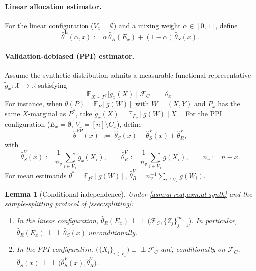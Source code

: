 \documentclass[11pt]{article}
\theoremstyle{plain}
\newtheorem{lemma}[theorem]{Lemma}
\theoremstyle{definition}
\theoremstyle{remark}
\newcommand{\R}{\mathbb{R}}
\newcommand{\E}{\mathbb{E}}
\newcommand{\indep}{\perp\!\!\!\perp}
\begin{document}
\paragraph{Linear allocation estimator.}
For the linear configuration ($V_x=\emptyset$) and a mixing weight $\alpha\in[0,1]$, define
\begin{equation}\label{eq:linest}
\hat\theta^{\mathrm{L}}(\alpha,x):=\alpha\,\hat\theta_R(E_x)+(1-\alpha)\,\hat\theta_S(x).
\end{equation}

\paragraph{Validation-debiased (PPI) estimator.}
Assume the synthetic distribution admits a measurable functional representative $\tilde g_x:\mathcal{X}\to\R$ satisfying
\begin{equation}\label{eq:tildeg}
\E_{X\sim P^*}\bigl[\tilde g_x(X)\mid\mathcal{F}_C\bigr]\;=\;\theta_x.
\end{equation}
For instance, when $\theta(P)=\E_P[g(W)]$ with $W=(X,Y)$ and $P_x$ has the same $X$-marginal as $P^*$, take $\tilde g_x(X)=\E_{P_x}[g(W)\mid X]$. For the PPI configuration ($E_x=\emptyset$, $V_x=[n]\setminus C_x$), define
\begin{equation}\label{eq:ppi}
\hat\theta^{\mathrm{PP}}(x)\;:=\;\hat\theta_S(x)-\hat\theta_S^V(x)+\hat\theta_R^V,
\end{equation}
with
\begin{equation*}
\hat\theta_S^V(x):=\frac{1}{n_v}\sum_{i\in V_x}\tilde g_x(X_i),\qquad
\hat\theta_R^V:=\frac{1}{n_v}\sum_{i\in V_x}g(X_i),\qquad n_v:=n-x.
\end{equation*}
For mean estimands $\theta^*=\E_{P^*}[g(W)]$, $\hat\theta_R^V=n_v^{-1}\sum_{i\in V_x}g(W_i)$.

\begin{lemma}[Conditional independence]\label{lem:ci}
Under \cref{asm:al-real,asm:al-synth} and the sample-splitting protocol of \cref{ssec:splitting}:
\begin{enumerate}[label=\rm(\roman*),leftmargin=*]
\item In the linear configuration, $\hat\theta_R(E_x)\indep\bigl(\mathcal{F}_C,\{Z_j\}_{j=1}^{m_n}\bigr)$. In particular, $\hat\theta_R(E_x)\indep\hat\theta_S(x)$ unconditionally.
\item In the PPI configuration, $\bigl(\{X_i\}_{i\in V_x}\bigr)\indep\mathcal{F}_C$ and, conditionally on $\mathcal{F}_C$, $\hat\theta_S(x)\indep\bigl(\hat\theta_S^V(x),\hat\theta_R^V\bigr)$.
\end{enumerate}
\end{lemma}
\end{document}
